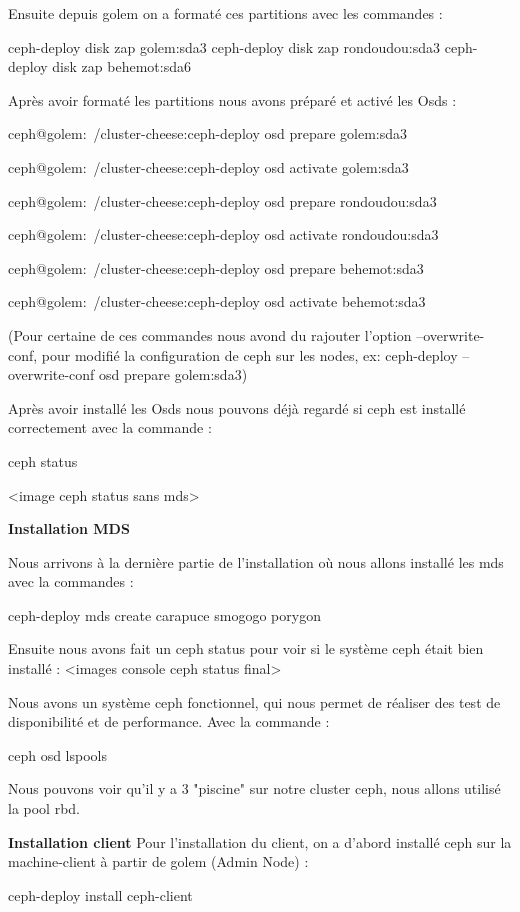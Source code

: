 \documentclass{article}
\begin{document}
Ensuite depuis golem on a formaté ces partitions avec les commandes :

ceph-deploy disk zap golem:sda3
ceph-deploy disk zap rondoudou:sda3
ceph-deploy disk zap behemot:sda6

Après avoir formaté les partitions nous avons préparé et activé les Osds :

ceph@golem:~/cluster-cheese:ceph-deploy osd prepare golem:sda3

ceph@golem:~/cluster-cheese:ceph-deploy osd activate golem:sda3

ceph@golem:~/cluster-cheese:ceph-deploy osd prepare rondoudou:sda3

ceph@golem:~/cluster-cheese:ceph-deploy osd activate rondoudou:sda3

ceph@golem:~/cluster-cheese:ceph-deploy osd prepare behemot:sda3

ceph@golem:~/cluster-cheese:ceph-deploy osd activate behemot:sda3

(Pour certaine de ces commandes nous avond du rajouter l'option --overwrite-conf, pour modifié la configuration de ceph sur les nodes, 
ex: ceph-deploy --overwrite-conf osd prepare golem:sda3)

Après avoir installé les Osds nous pouvons déjà regardé si ceph est installé correctement avec la commande :

ceph status

<image ceph status sans mds>

\textbf{Installation MDS}

Nous arrivons à la dernière partie de l'installation où nous allons installé les mds avec la commandes :

ceph-deploy mds create carapuce smogogo porygon

Ensuite nous avons fait un ceph status pour voir si le système ceph était bien installé :
<images console ceph status final>

Nous avons un système ceph fonctionnel, qui nous permet de réaliser des test de disponibilité et de performance.
Avec la commande :

ceph osd lspools

Nous pouvons voir qu'il y a 3 "piscine" sur notre cluster ceph, nous allons utilisé la pool rbd.

\textbf{Installation client}
Pour l'installation du client, on a d'abord installé ceph sur la machine-client à partir de golem (Admin Node) :

ceph-deploy install ceph-client
\end{document}
